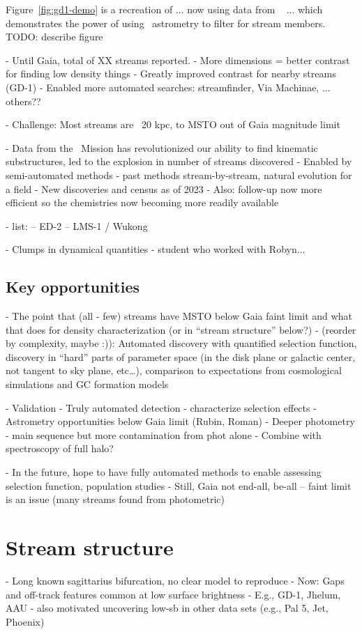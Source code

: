 \documentclass[final,5p,times,twocolumn,authoryear]{elsarticle}
\begin{document}
Figure~\ref{fig:gd1-demo} is a recreation of ... now using data from \gaia\  ...
which demonstrates the power of using \gaia\ astrometry to filter for stream members.
TODO: describe figure



- Until Gaia, total of XX streams reported.
- More dimensions = better contrast for finding low density things
- Greatly improved contrast for nearby streams (GD-1)
- Enabled more automated searches: streamfinder, Via Machinae, ... others??

- Challenge: Most streams are ~20 kpc, to MSTO out of Gaia magnitude limit

- Data from the \gaia\ Mission has revolutionized our ability to find kinematic substructures, led to the explosion in number of streams discovered
- Enabled by semi-automated methods - past methods stream-by-stream, natural evolution for a field
- New discoveries and census as of 2023
- Also: follow-up now more efficient so the chemistries now becoming more readily available

- list:
-- ED-2
-- LMS-1 / Wukong

- Clumps in dynamical quantities - student who worked with Robyn...


\subsection{Key opportunities}
- The point that (all - few) streams have MSTO below Gaia faint limit and what that does for density characterization (or in “stream structure” below?)
- (reorder by complexity, maybe :)): Automated discovery with quantified selection function, discovery in “hard” parts of parameter space (in the disk plane or galactic center, not tangent to sky plane, etc…), comparison to expectations from cosmological simulations and GC formation models


- Validation
- Truly automated detection - characterize selection effects
- Astrometry opportunities below Gaia limit (Rubin, Roman)
- Deeper photometry - main sequence but more contamination from phot alone
    - Combine with spectroscopy of full halo?

- In the future, hope to have fully automated methods to enable assessing selection function, population studies
- Still, Gaia not end-all, be-all -- faint limit is an issue (many streams found from photometric)


\section{Stream structure}
\label{sec:structure}
- Long known sagittarius bifurcation, no clear model to reproduce
- Now: Gaps and off-track features common at low surface brightness
- E.g., GD-1, Jhelum, AAU
- also motivated uncovering low-sb in other data sets (e.g., Pal 5, Jet, Phoenix)
\end{document}
